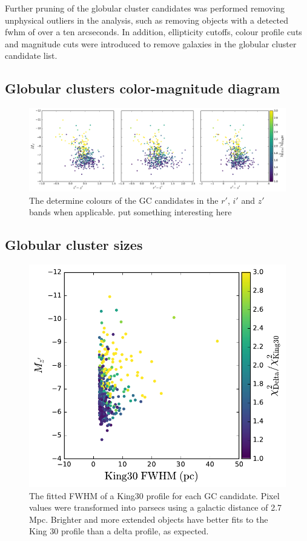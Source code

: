 \documentclass[useAMS,usenatbib]{mn2e}
\begin{document}
Further pruning of the globular cluster candidates was performed removing unphysical outliers in the analysis, such as removing objects with a detected fwhm of over a ten arcseconds. In addition, ellipticity cutoffs, colour profile cuts and magnitude cuts were introduced to remove galaxies in the globular cluster candidate list. 


\subsection{Globular clusters color-magnitude diagram}
\label{sec:gc_cmd}

\begin{figure}
	\includegraphics[width=\textwidth]{images/colour.pdf}
	\caption{The determine colours of the GC candidates in the $r'$, $i'$ and $z'$ bands when applicable.{\color{red} put something interesting here} }
	\label{fig:colour}
\end{figure}

\lipsum[1-2]

\subsection{Globular cluster sizes}
\label{sec:gc_sizes}
\begin{figure}
	\includegraphics[width=\columnwidth]{images/kingFWHM.pdf}
	\caption{The fitted FWHM of a King30 profile for each GC candidate. Pixel values were transformed into parsecs using a galactic distance of 2.7 Mpc. Brighter and more extended objects have better fits to the King 30 profile than a delta profile, as expected.}
	\label{fig:kfwhm}
\end{figure}
\end{document}
